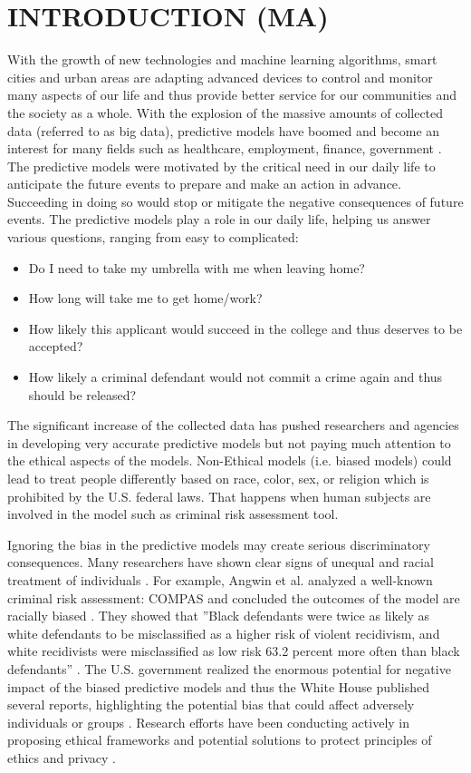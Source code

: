 \documentclass[sigconf]{acmart}
\begin{document}
\section{INTRODUCTION (MA)}
\label{sec:introduction}
With the growth of new technologies and machine learning algorithms, smart cities and urban areas are adapting advanced devices to control and monitor many aspects of our life and thus provide better service for our communities and the society as a whole. With the explosion of the massive amounts of collected data (referred to as big data), predictive models have boomed and become an interest for many fields such as healthcare, employment, finance, government \cite{siegel2016predictive}. The predictive models were motivated by the critical need in our daily life to anticipate the future events to prepare and make an action in advance. Succeeding in doing so would stop or mitigate the negative consequences of future events. The predictive models play a role in our daily life, helping us answer various questions, ranging from easy to complicated:\begin{itemize}
\item Do I need to take my umbrella with me when leaving home? 
\item How long will take me to get home/work?
\item How likely this applicant would succeed in the college and thus deserves to be accepted?
\item How likely a criminal defendant would not commit a crime again and thus should be released?
\end{itemize}

The significant increase of the collected data has pushed researchers and agencies in developing very accurate predictive models but not paying much attention to the ethical aspects of the models. Non-Ethical models (i.e. biased models) could lead to treat people differently based on race, color, sex, or religion which is prohibited by the U.S. federal laws. That happens when human subjects are involved in the model such as criminal risk assessment tool.

Ignoring the bias in the predictive models may create serious discriminatory consequences. Many researchers have shown clear signs of unequal and racial treatment of individuals \cite{squires2003racial,stoll2004black,angwinmachine}.  For example, Angwin et al. analyzed a well-known criminal risk assessment: COMPAS and concluded the outcomes of the model are racially biased \cite{angwinmachine}. They showed that ''Black defendants were twice as likely as white defendants to be misclassified as a higher risk of violent recidivism, and white recidivists were misclassified as low risk 63.2 percent more often than black defendants'' . The U.S. government realized the enormous potential for negative impact of the biased predictive models and thus the White House published several reports, highlighting the potential bias that could affect adversely individuals or groups \cite{smith2016big}. Research efforts have been conducting actively in proposing ethical frameworks and potential solutions to protect principles of ethics and privacy \cite{dedeo2014wrong,vayena2016elements,kass2001ethics}.
\end{document}

